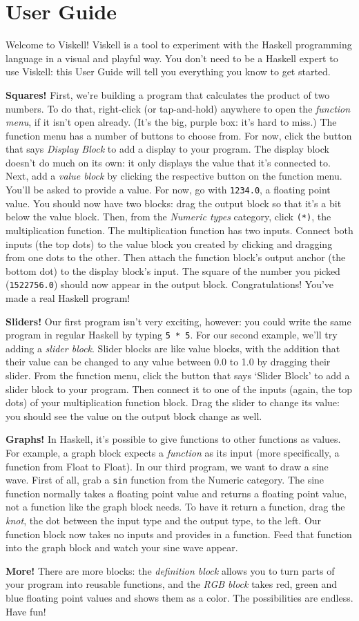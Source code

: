 \chapter{User Guide}
\label{chap:Guide}

Welcome to Viskell! Viskell is a tool to experiment with the Haskell programming language in a visual and playful way.
You don't need to be a Haskell expert to use Viskell: this User Guide will tell you everything you know to get started.

\textbf{Squares!}
First, we're building a program that calculates the product of two numbers.
To do that, right-click (or tap-and-hold) anywhere to open the \emph{function menu}, if it isn't open already.
(It's the big, purple box: it's hard to miss.)
The function menu has a number of buttons to choose from.
For now, click the button that says \emph{Display Block} to add a display to your program.
The display block doesn't do much on its own: it only displays the value that it's connected to.
Next, add a \emph{value block} by clicking the respective button on the function menu.
You'll be asked to provide a value. For now, go with \texttt{1234.0}, a floating point value.
You should now have two blocks: drag the output block so that it's a bit below the value block.
Then, from the \emph{Numeric types} category, click \texttt{(*)}, the multiplication function.
The multiplication function has two inputs.
Connect both inputs (the top dots) to the value block you created by clicking and dragging from one dots to the other.
Then attach the function block's output anchor (the bottom dot) to the display block's input.
The square of the number you picked (\texttt{1522756.0}) should now appear in the output block.
Congratulations!
You've made a real Haskell program!

\textbf{Sliders!}
Our first program isn't very exciting, however: you could write the same program in regular Haskell by typing \texttt{5 * 5}.
For our second example, we'll try adding a \emph{slider block}.
Slider blocks are like value blocks, with the addition that their value can be changed to any value between 0.0 to 1.0 by dragging their slider.
From the function menu, click the button that says `Slider Block' to add a slider block to your program.
Then connect it to one of the inputs (again, the top dots) of your multiplication function block.
Drag the slider to change its value: you should see the value on the output block change as well.

\textbf{Graphs!}
In Haskell, it's possible to give functions to other functions as values.
For example, a graph block expects a \emph{function} as its input (more specifically, a function from Float to Float).
In our third program, we want to draw a sine wave.
First of all, grab a \texttt{sin} function from the Numeric category.
The sine function normally takes a floating point value and returns a floating point value, not a function like the graph block needs.
To have it return a function, drag the \emph{knot}, the dot between the input type and the output type, to the left.
Our function block now takes no inputs and provides in a function.
Feed that function into the graph block and watch your sine wave appear.

\textbf{More!}
There are more blocks: the \emph{definition block} allows you to turn parts of your program into reusable functions, and the \emph{RGB block} takes red, green and blue floating point values and shows them as a color.
The possibilities are endless.
Have fun!